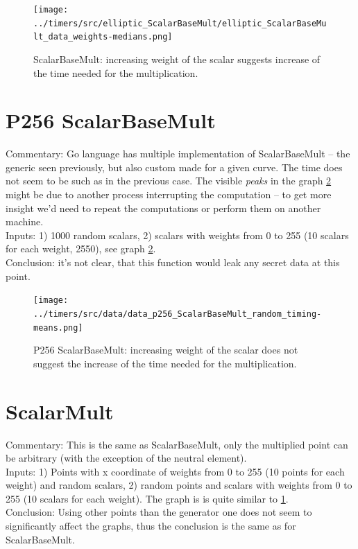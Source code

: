 \documentclass[a4paper]{scrartcl}
\begin{document}
\begin{figure}
    \centering
  \texttt{[image: ../timers/src/elliptic\_ScalarBaseMult/elliptic\_ScalarBaseMult\_data\_weights-medians.png]}
  \caption{ScalarBaseMult: increasing weight of the scalar suggests increase of the time needed for the multiplication.}
  \label{fig:generic_ScalarBaseMult}
\end{figure}

\section{P256 ScalarBaseMult}
Commentary: Go language has multiple implementation of ScalarBaseMult -- the generic seen previously, but also custom made for a given curve. The time does not seem to be such as in the previous case. The visible \textit{peaks} in the graph \ref{fig:p256_ScalarBaseMult} might be due to another process interrupting the computation -- to get more insight we'd need to repeat the computations or perform them on another machine.
\\Inputs: 1) 1000 random scalars, 2) scalars with weights from 0 to 255 (10 scalars for each weight, 2550), see graph \ref{fig:p256_ScalarBaseMult}.
\\Conclusion: it's not clear, that this function would leak any secret data at this point.

\begin{figure}
    \centering
  \texttt{[image: ../timers/src/data/data\_p256\_ScalarBaseMult\_random\_timing-means.png]}
  \caption{P256 ScalarBaseMult: increasing weight of the scalar does not suggest the increase of the time needed for the multiplication.}
  \label{fig:p256_ScalarBaseMult}
\end{figure}

\section{ScalarMult}
Commentary: This is the same as ScalarBaseMult, only the multiplied point can be arbitrary (with the exception of the neutral element).
\\Inputs: 1) Points with x coordinate of weights from 0 to 255 (10 points for each weight) and random scalars, 2) random points and scalars with weights from 0 to 255 (10 scalars for each weight). The graph is is quite similar to \ref{fig:generic_ScalarBaseMult}.%
\\Conclusion: Using other points than the generator one does not seem to significantly affect the graphs, thus the conclusion is the same as for ScalarBaseMult.
\end{document}

